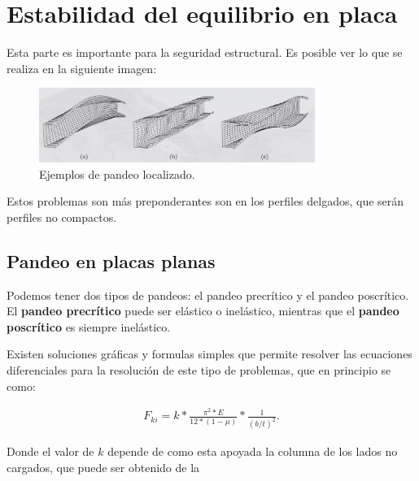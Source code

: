 \documentclass[../main.tex]{subfiles}
\begin{document}
\section{Estabilidad del equilibrio en placa}



Esta parte es importante para la seguridad estructural. Es posible ver lo que 
se realiza en la siguiente imagen:

\begin{figure}[htpb]
  \centering
  \includegraphics[width=0.8\textwidth]{../images/20210517/pandeo_local}
  \caption{Ejemplos de pandeo localizado.}
  \label{fig:pandeo_local}
\end{figure}

Estos problemas son más preponderantes son en los perfiles delgados, que serán
perfiles no compactos.

\subsection{Pandeo en placas planas}

Podemos tener dos tipos de pandeos: el pandeo precrítico y el pandeo poscrítico.
El \textbf{pandeo precrítico} puede ser elástico o inelástico, mientras que el
\textbf{pandeo poscrítico} es siempre inelástico.

Existen soluciones gráficas y formulas simples que permite resolver las ecuaciones
diferenciales para la resolución de este tipo de problemas, que en principio se
como:

\begin{align*}
  F_{ki} = k * \frac{\pi^{2}*E}{12*(1-\mu)}*\frac{1}{(b / t)^{2}}
.\end{align*}

Donde el valor de $k$ depende de como esta apoyada la columna de los lados no
cargados, que puede ser obtenido de la 
\end{document}
